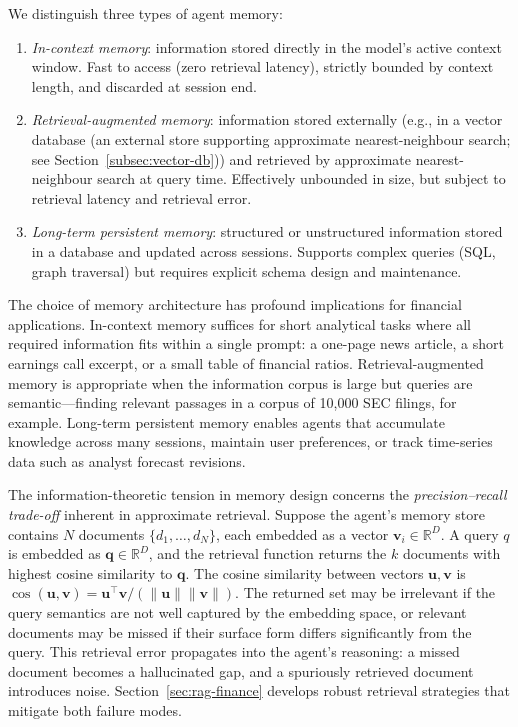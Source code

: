 \begin{deepdive}
\begin{definition}
\label{def:memory-taxonomy}
We distinguish three types of agent memory:
\begin{enumerate}
  \item \emph{In-context memory}: information stored directly in the model's active
        context window. Fast to access (zero retrieval latency), strictly bounded by
        context length, and discarded at session end.
  \item \emph{Retrieval-augmented memory}: information stored externally (e.g., in a
        vector database (an external store supporting approximate nearest-neighbour search; see Section~\ref{subsec:vector-db})) and retrieved by approximate nearest-neighbour search at query
        time. Effectively unbounded in size, but subject to retrieval latency and
        retrieval error.
  \item \emph{Long-term persistent memory}: structured or unstructured information
        stored in a database and updated across sessions. Supports complex queries
        (SQL, graph traversal) but requires explicit schema design and maintenance.
\end{enumerate}
\end{definition}

The choice of memory architecture has profound implications for financial applications.
In-context memory suffices for short analytical tasks where all required information
fits within a single prompt: a one-page news article, a short earnings call excerpt,
or a small table of financial ratios. Retrieval-augmented memory is appropriate when
the information corpus is large but queries are semantic---finding relevant passages in
a corpus of 10,000 SEC filings, for example. Long-term persistent memory enables agents
that accumulate knowledge across many sessions, maintain user preferences, or track
time-series data such as analyst forecast revisions.

The information-theoretic tension in memory design concerns the \emph{precision--recall
trade-off} inherent in approximate retrieval. Suppose the agent's memory store contains
$N$ documents $\{d_1, \ldots, d_N\}$, each embedded as a vector $\mathbf{v}_i \in
\mathbb{R}^D$. A query $q$ is embedded as $\mathbf{q} \in \mathbb{R}^D$, and the
retrieval function returns the $k$ documents with highest cosine similarity to
$\mathbf{q}$. The cosine similarity between vectors $\mathbf{u},\mathbf{v}$ is $\cos(\mathbf{u},\mathbf{v}) = \mathbf{u}^\top\mathbf{v}/(\|\mathbf{u}\|\|\mathbf{v}\|)$.
The returned set may be irrelevant if the query semantics are not well captured by the
embedding space, or relevant documents may be missed if their surface form differs
significantly from the query. This retrieval error propagates into the agent's
reasoning: a missed document becomes a hallucinated gap, and a spuriously retrieved
document introduces noise. Section~\ref{sec:rag-finance} develops robust retrieval
strategies that mitigate both failure modes.


\end{deepdive}
